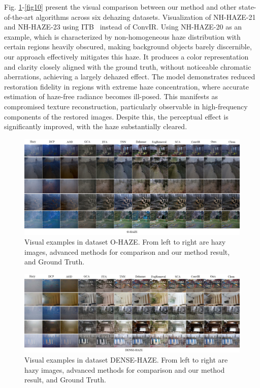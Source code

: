 \documentclass[journal]{IEEEtran}
\begin{document}
Fig. \ref{fig6}-\ref{fig10} present the visual comparison between our method and other state-of-the-art algorithms across six dehazing datasets. Visualization of NH-HAZE-21 and NH-HAZE-23 using ITB~\cite{liu2023data} instead of ConvIR. Using NH-HAZE-20 as an example, which is characterized by non-homogeneous haze distribution with certain regions heavily obscured, making background objects barely discernible, our approach effectively mitigates this haze. It produces a color representation and clarity closely aligned with the ground truth, without noticeable chromatic aberrations, achieving a largely dehazed effect. The model demonstrates reduced restoration fidelity in regions with extreme haze concentration, where accurate estimation of haze-free radiance becomes ill-posed. This manifests as compromised texture reconstruction, particularly observable in high-frequency components of the restored images. Despite this, the perceptual effect is significantly improved, with the haze substantially cleared.


\begin{figure}[!t]
	\centering
	\includegraphics[width=7in]{images/O-HAZE-compare}
	\caption{Visual examples in dataset O-HAZE. From left to right are hazy images, advanced methods for comparison and our method result, and Ground Truth.}
	\label{fig6}
\end{figure}

\begin{figure}[!t]
	\centering
	\includegraphics[width=7in]{images/DENSE-HAZE-compare}
	\caption{Visual examples in dataset DENSE-HAZE. From left to right are hazy images, advanced methods for comparison and our method result, and Ground Truth.}
	\label{fig7}
\end{figure}
\end{document}
